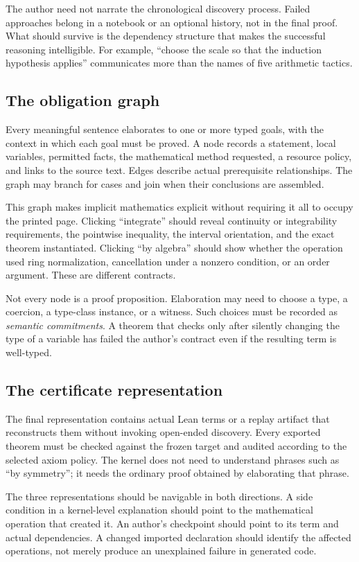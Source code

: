 \documentclass[11pt,a4paper]{article}
\theoremstyle{definition}
\theoremstyle{remark}
\begin{document}
The author need not narrate the chronological discovery process. Failed approaches belong in a notebook or an optional history, not in the final proof. What should survive is the dependency structure that makes the successful reasoning intelligible. For example, ``choose the scale so that the induction hypothesis applies'' communicates more than the names of five arithmetic tactics.

\subsection{The obligation graph}
Every meaningful sentence elaborates to one or more typed goals, with the context in which each goal must be proved. A node records a statement, local variables, permitted facts, the mathematical method requested, a resource policy, and links to the source text. Edges describe actual prerequisite relationships. The graph may branch for cases and join when their conclusions are assembled.

This graph makes implicit mathematics explicit without requiring it all to occupy the printed page. Clicking ``integrate'' should reveal continuity or integrability requirements, the pointwise inequality, the interval orientation, and the exact theorem instantiated. Clicking ``by algebra'' should show whether the operation used ring normalization, cancellation under a nonzero condition, or an order argument. These are different contracts.

Not every node is a proof proposition. Elaboration may need to choose a type, a coercion, a type-class instance, or a witness. Such choices must be recorded as \emph{semantic commitments}. A theorem that checks only after silently changing the type of a variable has failed the author's contract even if the resulting term is well-typed.

\subsection{The certificate representation}
The final representation contains actual Lean terms or a replay artifact that reconstructs them without invoking open-ended discovery. Every exported theorem must be checked against the frozen target and audited according to the selected axiom policy. The kernel does not need to understand phrases such as ``by symmetry''; it needs the ordinary proof obtained by elaborating that phrase.

The three representations should be navigable in both directions. A side condition in a kernel-level explanation should point to the mathematical operation that created it. An author's checkpoint should point to its term and actual dependencies. A changed imported declaration should identify the affected operations, not merely produce an unexplained failure in generated code.
\end{document}
